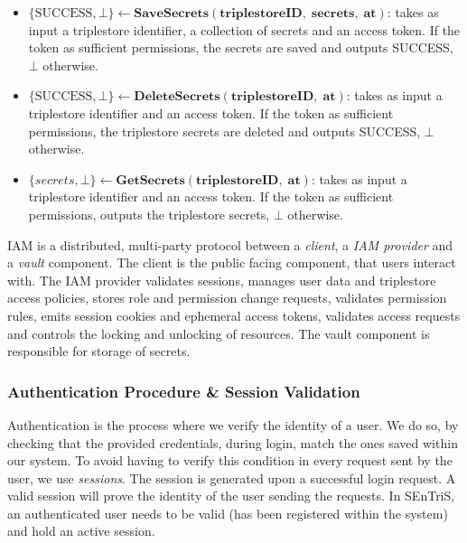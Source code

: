 \begin{definition}
\begin{itemize}

        \item $\{\textrm{SUCCESS}, \bot\} \leftarrow \mathbf{SaveSecrets(triplestoreID, \; secrets, \; at)}$: takes as input a triplestore identifier, a collection of secrets and an access token. If the token as sufficient permissions, the secrets are saved and outputs SUCCESS, $\bot$ otherwise.

        \item $\{\textrm{SUCCESS}, \bot\} \leftarrow \mathbf{DeleteSecrets(triplestoreID, \; at)}$: takes as input a triplestore identifier and an access token. If the token as sufficient permissions, the triplestore secrets are deleted and outputs SUCCESS, $\bot$ otherwise.

        \item $\{secrets, \bot\} \leftarrow \mathbf{GetSecrets(triplestoreID, \; at)}$:  takes as input a triplestore identifier and an access token. If the token as sufficient permissions, outputs the triplestore secrets, $\bot$ otherwise.


    \end{itemize}
    IAM is a distributed, multi-party protocol between a \emph{client}, a \emph{IAM provider} and a \emph{vault} component. The client is the public facing component, that users interact with. The IAM provider validates sessions, manages user data and triplestore access policies, stores role and permission change requests, validates permission rules, emits session cookies and ephemeral access tokens, validates access requests and controls the locking and unlocking of resources. The vault component is responsible for storage of secrets.
\end{definition}

\subsubsection{Authentication Procedure \& Session Validation}

Authentication is the process where we verify the identity of a user. We do so, by checking that the provided credentials, during login, match the ones saved within our system. To avoid having to verify this condition in every request sent by the user, we use \emph{sessions}. The session is generated upon a successful login request. A valid session will prove the identity of the user sending the requests. In \gls{SEnTriS}, an authenticated user needs to be valid (has been registered within the system) and hold an active session.

